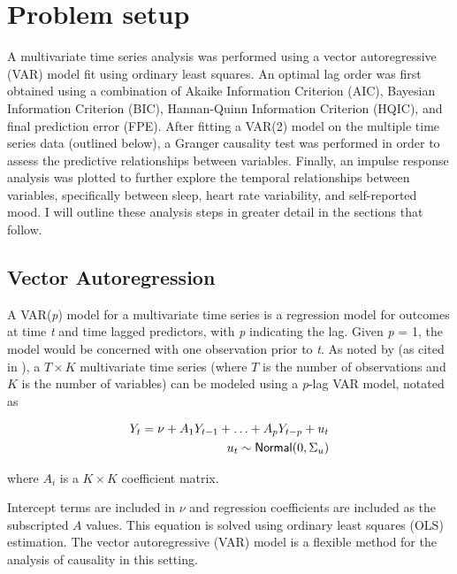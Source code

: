 \documentclass{article}
\begin{document}
\hypertarget{methods}{%
\section{Problem setup}\label{methods}}

A multivariate time series analysis was performed using a vector autoregressive
(VAR) model fit using ordinary least squares. An optimal lag order was first
obtained using a combination of Akaike Information Criterion (AIC), Bayesian
Information Criterion (BIC), Hannan-Quinn Information Criterion (HQIC), and
final prediction error (FPE). After fitting a VAR(2) model on the multiple time
series data (outlined below), a Granger causality test was performed in order to
assess the predictive relationships between variables. Finally, an impulse
response analysis was plotted to further explore the temporal relationships
between variables, specifically between sleep, heart rate variability, and
self-reported mood. I will outline these analysis steps in greater detail in the
sections that follow.

\hypertarget{vector-autoregression}{%
\subsection{Vector Autoregression}\label{vector-autoregression}}


A VAR(\textit{p}) model for a multivariate time series is a regression model for
outcomes at time \textit{t} and time lagged predictors, with \textit{p}
indicating the lag. Given \textit{p} = 1, the model would be concerned with one
observation prior to \textit{t}. As noted by \citet{lutkepohlNew2005}
(as cited in \citealt{seabold2010statsmodels}), a \(T \times K\) multivariate time
series (where \(T\) is the number of observations and \(K\) is the number of
variables) can be modeled using a \textit{p}-lag VAR model, notated as


\begin{equation}
  \begin{split}
    Y_t = \nu + A_1 Y_{t-1} + \ldots + A_p Y_{t-p} + u_t \\ u_t \sim {\sf Normal}(0, \Sigma_u)
  \end{split}
\end{equation}

where \(A_i\) is a \(K \times K\) coefficient matrix.


Intercept terms are included in \(\nu\) and regression coefficients are included
as the subscripted \(A\) values. This equation is solved using ordinary least
squares (OLS) estimation. The vector autoregressive (VAR) model is a flexible
method for the analysis of causality in this setting.
\end{document}
